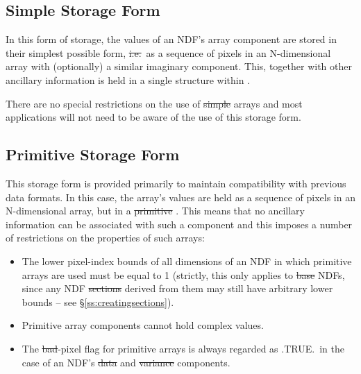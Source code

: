 \subsection{\label{ss:simpleform}Simple Storage Form}

In this form of storage, the values of an NDF's array component 
are stored in their simplest possible form, \st{i.e.}\ as a sequence of
pixels in an N-dimensional array with (optionally) a similar imaginary
component. 
This, together with other ancillary information is held in a single
 structure within .

There are no special restrictions on the use of \st{simple\/} arrays and most
applications will not need to be aware of the use of this storage form. 

\subsection{\label{ss:implicitformchange}\label{ss:primitiveform}Primitive Storage Form}

This storage form is provided primarily to maintain compatibility with
previous data formats. 
In this case, the array's values are held as a sequence of pixels in an
N-dimensional array, but in a \st{primitive\/} .
This means that no ancillary information can be associated with such a
component and this imposes a number of restrictions on the properties of
such arrays: 

\begin{itemize}

\item
The lower pixel-index bounds of all dimensions of an NDF in which primitive
arrays are used must be equal to 1 (strictly, this only applies to \st{base\/} NDFs, since any NDF \st{sections\/} derived from them may still have
arbitrary lower bounds -- see \S\ref{ss:creatingsections}). 

\item
Primitive array components cannot hold complex values.

\item
The \st{bad\/}-pixel flag for primitive arrays is always regarded as
.TRUE.\ in the case of an NDF's \st{data\/} and \st{variance\/}
components.

\end{itemize}


